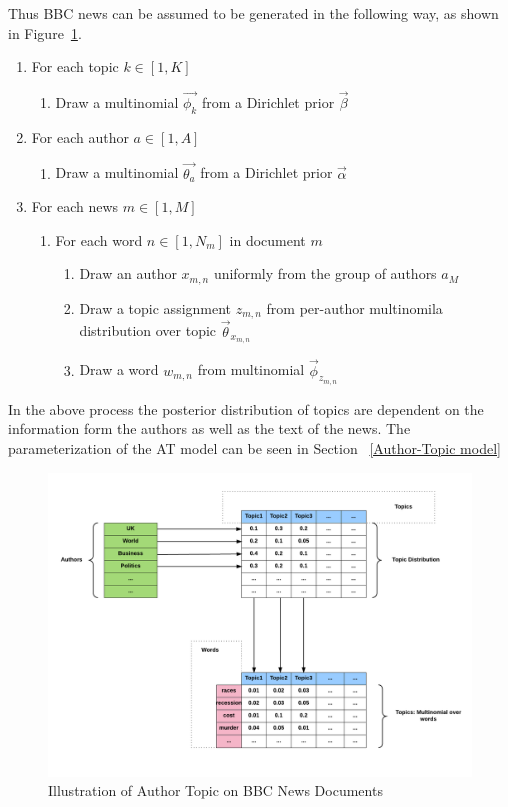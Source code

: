 Thus BBC news can be assumed to be generated in the following way, as shown in Figure~\ref{fig:author_diagram}.

\begin{enumerate}
   \item For each topic $k \in [1,K]$
   \begin{enumerate}
     \item Draw a multinomial $\vec{\phi_k}$ from a Dirichlet prior $\vec{\beta}$
    \end{enumerate}
   \item For each author $a \in [1,A]$
   \begin{enumerate}
     \item Draw a multinomial $\vec{\theta_a}$ from a Dirichlet prior $\vec{\alpha}$
    \end{enumerate}
    \item For each news $m \in [1,M]$
   \begin{enumerate}
     \item For each word $n \in [1,N_m]$ in document $m$
     \begin{enumerate}
            \item Draw an author $x_{m,n}$ uniformly from the group of authors $a_M$
            \item Draw a topic assignment $z_{m,n}$ from per-author multinomila distribution over topic $\vec{\theta}_{x_{m, n}}$ %
            \item Draw a word $w_{m,n}$ from multinomial $\vec{\phi}_{z_{m, n}}$
    \end{enumerate}
    \end{enumerate}
        
\end{enumerate}

In the above process the posterior distribution of topics are dependent on the information form the authors as well as the text of the news. The parameterization of the AT model can be seen in Section ~\ref{Author-Topic model}

\begin{figure}[h]
\centering
\includegraphics[width=\textwidth]{figures/author_diagram.png}
\caption{Illustration of Author Topic on BBC News Documents}
\label{fig:author_diagram}
\end{figure}


